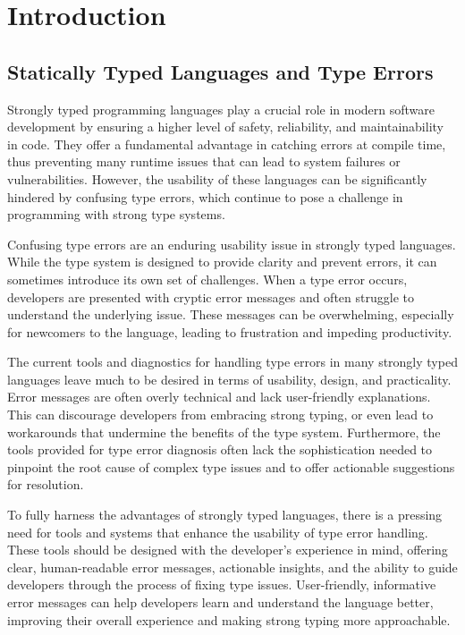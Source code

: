 
\chapter{Introduction}
\label{chapter1} 

\section{Statically Typed Languages and Type Errors}

Strongly typed programming languages play a crucial role in modern software development by ensuring a higher level of safety, reliability, and maintainability in code. They offer a fundamental advantage in catching errors at compile time, thus preventing many runtime issues that can lead to system failures or vulnerabilities. However, the usability of these languages can be significantly hindered by confusing type errors, which continue to pose a challenge in programming with strong type systems.

Confusing type errors are an enduring usability issue in strongly typed languages. While the type system is designed to provide clarity and prevent errors, it can sometimes introduce its own set of challenges. When a type error occurs, developers are presented with cryptic error messages and often struggle to understand the underlying issue. These messages can be overwhelming, especially for newcomers to the language, leading to frustration and impeding productivity.

The current tools and diagnostics for handling type errors in many strongly typed languages leave much to be desired in terms of usability, design, and practicality. Error messages are often overly technical and lack user-friendly explanations. This can discourage developers from embracing strong typing, or even lead to workarounds that undermine the benefits of the type system. Furthermore, the tools provided for type error diagnosis often lack the sophistication needed to pinpoint the root cause of complex type issues and to offer actionable suggestions for resolution.

To fully harness the advantages of strongly typed languages, there is a pressing need for tools and systems that enhance the usability of type error handling. These tools should be designed with the developer's experience in mind, offering clear, human-readable error messages, actionable insights, and the ability to guide developers through the process of fixing type issues. User-friendly, informative error messages can help developers learn and understand the language better, improving their overall experience and making strong typing more approachable.




